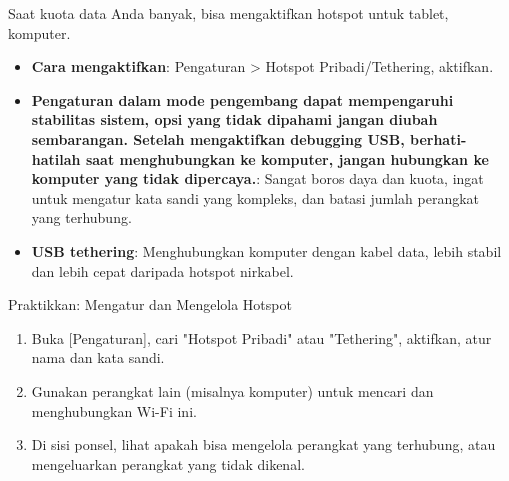 
Saat kuota data Anda banyak, bisa mengaktifkan hotspot untuk tablet, komputer.

\begin{itemize}
  \item \textbf{Cara mengaktifkan}: Pengaturan > Hotspot Pribadi/Tethering, aktifkan.
  \item \textbf{Pengaturan dalam mode pengembang dapat mempengaruhi stabilitas sistem, opsi yang tidak dipahami jangan diubah sembarangan. Setelah mengaktifkan debugging USB, berhati-hatilah saat menghubungkan ke komputer, jangan hubungkan ke komputer yang tidak dipercaya.}: Sangat boros daya dan kuota, ingat untuk mengatur kata sandi yang kompleks, dan batasi jumlah perangkat yang terhubung.
  \item \textbf{USB tethering}: Menghubungkan komputer dengan kabel data, lebih stabil dan lebih cepat daripada hotspot nirkabel.
\end{itemize}

\begin{tcbpractice}{Praktikkan: Mengatur dan Mengelola Hotspot}
\begin{enumerate}
  \item Buka [Pengaturan], cari "Hotspot Pribadi" atau "Tethering", aktifkan, atur nama dan kata sandi.
  \item Gunakan perangkat lain (misalnya komputer) untuk mencari dan menghubungkan Wi-Fi ini.
  \item Di sisi ponsel, lihat apakah bisa mengelola perangkat yang terhubung, atau mengeluarkan perangkat yang tidak dikenal.
\end{enumerate}

\end{tcbpractice}
